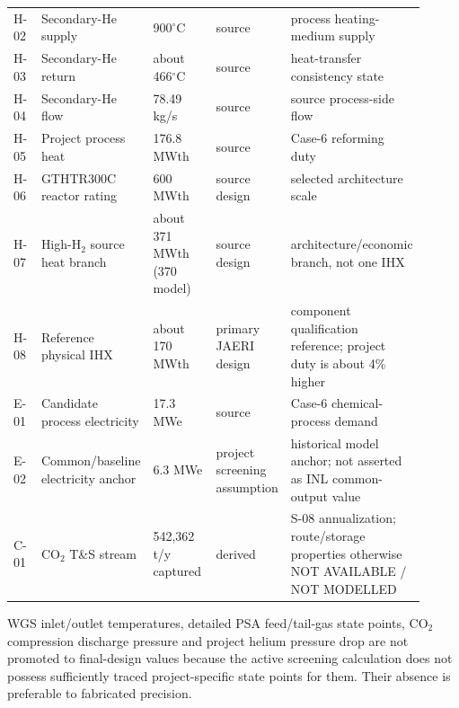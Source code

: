 \begin{longtable}{p{0.08\linewidth}p{0.25\linewidth}p{0.17\linewidth}p{0.18\linewidth}p{0.23\linewidth}}
H-02 & Secondary-He supply & 900$^\circ$C & source & process heating-medium supply~\cite{inltev961}\\
H-03 & Secondary-He return & about 466$^\circ$C & source & heat-transfer consistency state~\cite{inltev961}\\
H-04 & Secondary-He flow & 78.49 kg/s & source & source process-side flow~\cite{inltev961}\\
H-05 & Project process heat & 176.8 MWth & source & Case-6 reforming duty~\cite{inltev961}\\
H-06 & GTHTR300C reactor rating & 600 MWth & source design & selected architecture scale~\cite{nishihara2007potential}\\
H-07 & High-H$_2$ source heat branch & about 371 MWth (370 model) & source design & architecture/economic branch, not one IHX~\cite{nishihara2007potential}\\
H-08 & Reference physical IHX & about 170 MWth~\cite{jaeri2004gthtr300c} & primary JAERI design & component qualification reference; project duty is about 4\% higher\\
E-01 & Candidate process electricity & 17.3 MWe & source & Case-6 chemical-process demand~\cite{inltev961}\\
E-02 & Common/baseline electricity anchor & 6.3 MWe & project screening assumption & historical model anchor; not asserted as INL common-output value\\
C-01 & CO$_2$ T\&S stream & 542,362 t/y captured & derived & S-08 annualization; route/storage properties otherwise NOT AVAILABLE / NOT MODELLED\\
\bottomrule
\end{longtable}

WGS inlet/outlet temperatures, detailed PSA feed/tail-gas state points, CO$_2$ compression discharge pressure and project helium pressure drop are not promoted to final-design values because the active screening calculation does not possess sufficiently traced project-specific state points for them. Their absence is preferable to fabricated precision.
